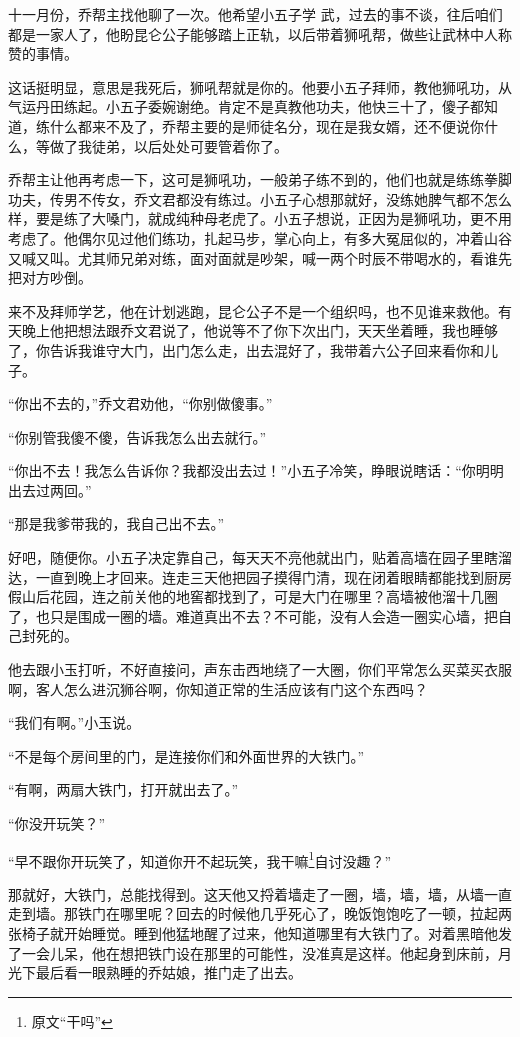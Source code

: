 十一月份，乔帮主找他聊了一次。他希望小五子学
武，过去的事不谈，往后咱们都是一家人了，他盼昆仑公子能够踏上正轨，以后带着狮吼帮，做些让武林中人称赞的事情。

这话挺明显，意思是我死后，狮吼帮就是你的。他要小五子拜师，教他狮吼功，从气运丹田练起。小五子委婉谢绝。肯定不是真教他功夫，他快三十了，傻子都知道，练什么都来不及了，乔帮主要的是师徒名分，现在是我女婿，还不便说你什么，等做了我徒弟，以后处处可要管着你了。

乔帮主让他再考虑一下，这可是狮吼功，一般弟子练不到的，他们也就是练练拳脚功夫，传男不传女，乔文君都没有练过。小五子心想那就好，没练她脾气都不怎么样，要是练了大嗓门，就成纯种母老虎了。小五子想说，正因为是狮吼功，更不用考虑了。他偶尔见过他们练功，扎起马步，掌心向上，有多大冤屈似的，冲着山谷又喊又叫。尤其师兄弟对练，面对面就是吵架，喊一两个时辰不带喝水的，看谁先把对方吵倒。

来不及拜师学艺，他在计划逃跑，昆仑公子不是一个组织吗，也不见谁来救他。有天晚上他把想法跟乔文君说了，他说等不了你下次出门，天天坐着睡，我也睡够了，你告诉我谁守大门，出门怎么走，出去混好了，我带着六公子回来看你和儿子。

“你出不去的，”乔文君劝他，“你别做傻事。”

“你别管我傻不傻，告诉我怎么出去就行。”

“你出不去！我怎么告诉你？我都没出去过！”小五子冷笑，睁眼说瞎话：“你明明出去过两回。”

“那是我爹带我的，我自己出不去。”

好吧，随便你。小五子决定靠自己，每天天不亮他就出门，贴着高墙在园子里瞎溜达，一直到晚上才回来。连走三天他把园子摸得门清，现在闭着眼睛都能找到厨房假山后花园，连之前关他的地窖都找到了，可是大门在哪里？高墙被他溜十几圈了，也只是围成一圈的墙。难道真出不去？不可能，没有人会造一圈实心墙，把自己封死的。

他去跟小玉打听，不好直接问，声东击西地绕了一大圈，你们平常怎么买菜买衣服啊，客人怎么进沉狮谷啊，你知道正常的生活应该有门这个东西吗？

“我们有啊。”小玉说。

“不是每个房间里的门，是连接你们和外面世界的大铁门。”

“有啊，两扇大铁门，打开就出去了。”

“你没开玩笑？”

“早不跟你开玩笑了，知道你开不起玩笑，我干嘛\footnote{原文“干吗”}自讨没趣？”

那就好，大铁门，总能找得到。这天他又捋着墙走了一圈，墙，墙，墙，从墙一直走到墙。那铁门在哪里呢？回去的时候他几乎死心了，晚饭饱饱吃了一顿，拉起两张椅子就开始睡觉。睡到他猛地醒了过来，他知道哪里有大铁门了。对着黑暗他发了一会儿呆，他在想把铁门设在那里的可能性，没准真是这样。他起身到床前，月光下最后看一眼熟睡的乔姑娘，推门走了出去。

